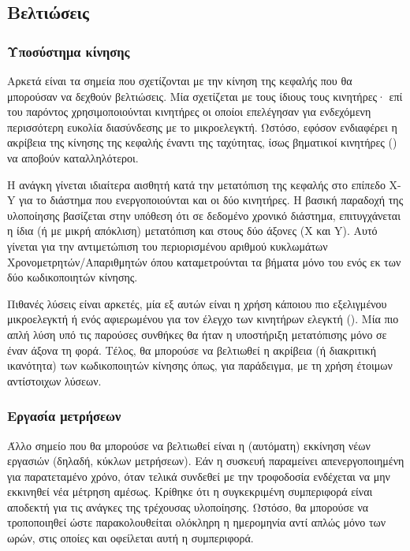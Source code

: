 \subsection{Βελτιώσεις}
\label{subsec:improvements}

\subsubsection{Υποσύστημα κίνησης}

Αρκετά είναι τα σημεία που σχετίζονται με την κίνηση της κεφαλής που θα
μπορούσαν να δεχθούν βελτιώσεις. Μία σχετίζεται με τους ίδιους τους κινητήρες·
επί του παρόντος χρησιμοποιούνται κινητήρες  οι οποίοι επελέγησαν για
ενδεχόμενη περισσότερη ευκολία διασύνδεσης με το μικροελεγκτή. Ωστόσο, εφόσον
ενδιαφέρει η ακρίβεια της κίνησης της κεφαλής έναντι της ταχύτητας, ίσως
βηματικοί κινητήρες () να αποβούν καταλληλότεροι.

Η ανάγκη γίνεται ιδιαίτερα αισθητή κατά την μετατόπιση της κεφαλής στο επίπεδο
X-Y για το διάστημα που ενεργοποιούνται και οι δύο κινητήρες. Η βασική παραδοχή
της υλοποίησης βασίζεται στην υπόθεση ότι σε δεδομένο χρονικό διάστημα,
επιτυγχάνεται η ίδια (ή με μικρή απόκλιση) μετατόπιση και στους δύο άξονες (X
και Y). Αυτό γίνεται για την αντιμετώπιση του περιορισμένου αριθμού κυκλωμάτων
Χρονομετρητών\slash{}Απαριθμητών όπου καταμετρούνται τα βήματα μόνο του ενός εκ
των δύο κωδικοποιητών κίνησης. 

Πιθανές λύσεις είναι αρκετές, μία εξ αυτών είναι η χρήση κάποιου πιο εξελιγμένου
μικροελεγκτή ή ενός αφιερωμένου για τον έλεγχο των κινητήρων ελεγκτή (). Μία πιο απλή λύση υπό τις παρούσες συνθήκες θα ήταν η υποστήριξη
μετατόπισης μόνο σε έναν άξονα τη φορά. Τέλος, θα μπορούσε να βελτιωθεί η
ακρίβεια (ή διακριτική ικανότητα) των κωδικοποιητών κίνησης όπως, για
παράδειγμα, με τη χρήση έτοιμων αντίστοιχων λύσεων.


\subsubsection{Εργασία μετρήσεων}

Άλλο σημείο που θα μπορούσε να βελτιωθεί είναι η (αυτόματη) εκκίνηση νέων
εργασιών (δηλαδή, κύκλων μετρήσεων).
Εάν η συσκευή παραμείνει απενεργοποιημένη για παρατεταμένο χρόνο, όταν τελικά
συνδεθεί με την τροφοδοσία ενδέχεται να μην εκκινηθεί νέα μέτρηση αμέσως.
Κρίθηκε ότι η συγκεκριμένη συμπεριφορά είναι αποδεκτή για τις ανάγκες της
τρέχουσας υλοποίησης. Ωστόσο, θα μπορούσε να τροποποιηθεί ώστε παρακολουθείται
ολόκληρη η ημερομηνία αντί απλώς μόνο των ωρών, στις οποίες και οφείλεται αυτή
η συμπεριφορά.

